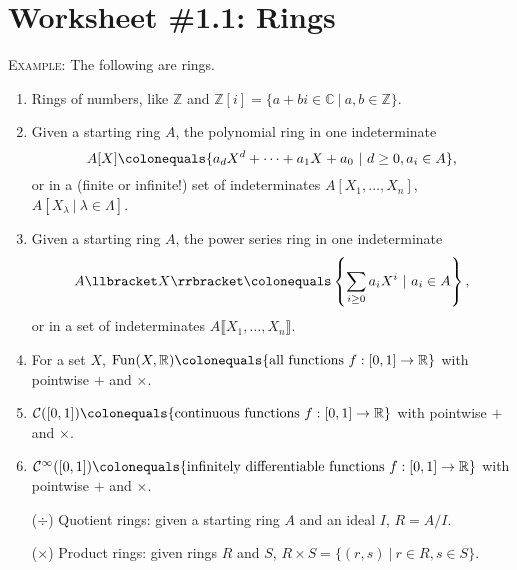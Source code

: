 \documentclass[12pt]{amsart}
\newcommand{\Z}{\mathbb{Z}}
\newcommand{\R}{\mathbb{R}}
\newcommand{\C}{\mathbb{C}}
\newcommand{\showsol}[1]{\def\displaysol{#1}}
\newcommand\ceq{\colonequals}
\begin{document}
\showsol{1}
	
	\thispagestyle{empty}
	
	\section*{Worksheet \#1.1: Rings}
	
	

\begin{framed}
\textsc{Example:} The following are rings.
\begin{enumerate}
\item Rings of numbers, like $\Z$ and $\Z[i] = \{ a + b i \in \C \ | \ a,b\in \Z\}$. 
\item Given a starting ring $A$, the polynomial ring in one indeterminate \[A[X] \ceq \{ a_d X^d + \cdots + a_1 X + a_0 \ | \ d\geq 0, a_i\in A\},\]
 or in a (finite or infinite!\footnotemark) set of indeterminates $A[X_1,\dots,X_n]$, \ $A[ X_\lambda \ | \ \lambda\in \Lambda]$.
 \item Given a starting ring $A$, the power series ring in one indeterminate \[A\llbracket X\rrbracket \ceq \left\{ \sum_{i\geq 0} a_i X^i \ | \  a_i\in A\right\},\]
 or in a set of indeterminates $A\llbracket X_1,\dots,X_n\rrbracket $.
\item For a set $X$, $\mathrm{Fun}(X,\R) \ceq \{ \text{all functions} \ f:[0,1] \to \R \}$ with pointwise $+$ and $\times$.
\item $\mathcal{C}([0,1]) \colonequals \{ \text{continuous functions} \ f:[0,1] \to \R \}$ with pointwise $+$ and $\times$.
\item $\mathcal{C}^\infty([0,1]) \colonequals \{ \text{infinitely differentiable functions} \ f:[0,1] \to \R \}$ with pointwise $+$ and $\times$.
 \item[($\div$)] Quotient rings: given a starting ring $A$ and an ideal $I$, $R=A/I$.
  \item[($\times$)] Product rings: given rings $R$ and $S$, $R\times S = \{(r,s) \ | \ r\in R, s\in S\}$.
\end{enumerate}



\end{framed}
\end{document}

